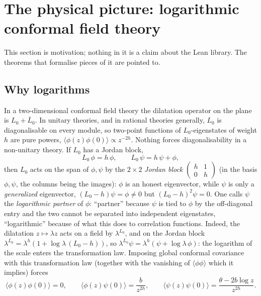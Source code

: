 \section{The physical picture: logarithmic conformal field theory}\label{l18:sec:physics}

This section is motivation; nothing in it is a claim about the Lean library. The theorems that
formalise pieces of it are pointed to.

\subsection{Why logarithms}
In a two-dimensional conformal field theory the dilatation operator on the plane is $L_0+\bar L_0$.
In unitary theories, and in rational theories generally, $L_0$ is diagonalisable on every module, so
two-point functions of $L_0$-eigenstates of weight $h$ are pure powers,
$\langle\phi(z)\phi(0)\rangle\propto z^{-2h}$. Nothing forces diagonalisability in a non-unitary
theory. If $L_0$ has a Jordan block,
\begin{equation}\label{l18:eq:jordan}
L_0\,\phi=h\,\phi,\qquad L_0\,\psi=h\,\psi+\phi,
\end{equation}
then $L_0$ acts on the span of $\phi,\psi$ by the $2\times2$ \emph{Jordan block}
$\left(\begin{smallmatrix}h&1\\0&h\end{smallmatrix}\right)$ (in the basis $\phi,\psi$, the columns being
the images): $\phi$ is an honest eigenvector, while $\psi$ is only a \emph{generalized} eigenvector,
$(L_0-h)\psi=\phi\neq0$ but $(L_0-h)^2\psi=0$. One calls $\psi$ the \emph{logarithmic partner} of
$\phi$: ``partner'' because $\psi$ is tied to $\phi$ by the off-diagonal entry and the two cannot be
separated into independent eigenstates, ``logarithmic'' because of what this does to correlation
functions. Indeed, the dilatation $z\mapsto\lambda z$ acts on a field by $\lambda^{L_0}$, and on the
Jordan block $\lambda^{L_0}=\lambda^h(1+\log\lambda\,(L_0-h))$, so $\lambda^{L_0}\psi=\lambda^h(\psi+\log\lambda\,\phi)$:
the logarithm of the scale enters the transformation law. Imposing global conformal covariance with this
transformation law (together with the vanishing of $\langle\phi\phi\rangle$ which it implies) forces
\begin{equation*}
\langle\phi(z)\phi(0)\rangle=0,\qquad \langle\phi(z)\psi(0)\rangle=\frac{b}{z^{2h}},\qquad
\langle\psi(z)\psi(0)\rangle=\frac{\theta-2b\log z}{z^{2h}} .
\end{equation*}
